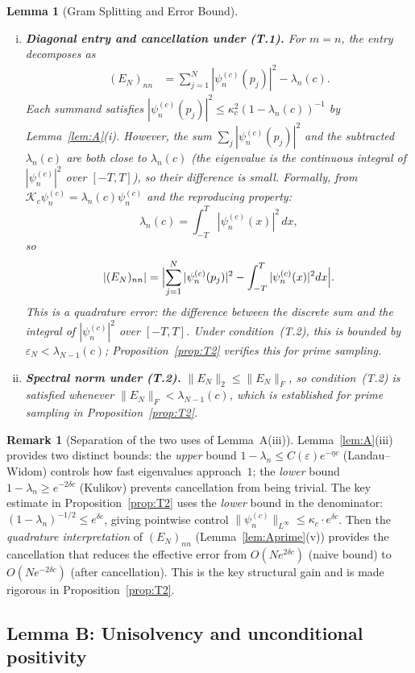 \documentclass[12pt,a4paper]{amsart}
\newtheorem{lemma}[theorem]{Lemma}
\theoremstyle{definition}
\newtheorem{remark}[theorem]{Remark}
\newcommand{\Kop}{\mathcal{K}_c}
\newcommand{\Kul}{\kappa_c}
\newcommand{\psin}{\psi_n^{(c)}}
\newcommand{\EN}{E_N}
\newcommand{\norm}[1]{\|#1\|}
\begin{document}
\begin{lemma}[Gram Splitting and Error Bound]
\begin{enumerate}[(i)]
\item \textbf{Diagonal entry and cancellation under (T.1).}
For $m=n$, the entry decomposes as
\begin{align*}
  (\EN)_{nn}
  &= \sum_{j=1}^N|\psi_n^{(c)}(p_j)|^2 - \lambda_n(c).
\end{align*}
Each summand satisfies $|\psi_n^{(c)}(p_j)|^2\leq\Kul^2(1-\lambda_n(c))^{-1}$
by Lemma~\ref{lem:A}(i).
However, the sum $\sum_j|\psi_n^{(c)}(p_j)|^2$ and the
subtracted $\lambda_n(c)$ are both close to $\lambda_n(c)$ (the
eigenvalue is the \emph{continuous} integral of $|\psin|^2$ over
$[-T,T]$), so their difference is small.
Formally, from $\Kop\psin=\lambda_n(c)\psin$ and the reproducing
property:
\[
  \lambda_n(c)
  = \int_{-T}^T|\psin(x)|^2\,dx,
\]
so
\[
  |(\EN)_{nn}|
  = \Bigl|\sum_{j=1}^N|\psin(p_j)|^2 - \int_{-T}^T|\psin(x)|^2dx\Bigr|.
\]
This is a \emph{quadrature error}: the difference between the
discrete sum and the integral of $|\psin|^2$ over $[-T,T]$.
Under condition~(T.2), this is bounded by $\varepsilon_N<\lambda_{N-1}(c)$;
Proposition~\ref{prop:T2} verifies this for prime sampling.

\item \textbf{Spectral norm under (T.2).}
$\norm{\EN}_2\leq\norm{\EN}_F$, so condition~(T.2) is satisfied
whenever $\norm{\EN}_F<\lambda_{N-1}(c)$, which is established for
prime sampling in Proposition~\ref{prop:T2}.
\end{enumerate}
\end{lemma}

\begin{remark}[Separation of the two uses of Lemma~A(iii)]\label{rem:gap}
Lemma~\ref{lem:A}(iii) provides two distinct bounds:
the \emph{upper} bound $1-\lambda_n\leq C(\varepsilon)e^{-\eta c}$
(Landau--Widom) controls how fast eigenvalues approach~$1$;
the \emph{lower} bound $1-\lambda_n\geq e^{-2\delta c}$ (Kulikov)
prevents cancellation from being trivial.
The key estimate in Proposition~\ref{prop:T2} uses the
\emph{lower} bound in the denominator:
$(1-\lambda_n)^{-1/2}\leq e^{\delta c}$, giving pointwise control
$\norm{\psin}_{L^\infty}\leq\Kul\cdot e^{\delta c}$.
Then the \emph{quadrature interpretation} of $(\EN)_{nn}$
(Lemma~\ref{lem:Aprime}(v)) provides the cancellation that
reduces the effective error from $O(N e^{2\delta c})$
(naive bound) to $O(N e^{-2\delta c})$ (after cancellation).
This is the key structural gain and is made rigorous in
Proposition~\ref{prop:T2}.
\end{remark}

\subsection{Lemma B: Unisolvency and unconditional positivity}
\end{document}

